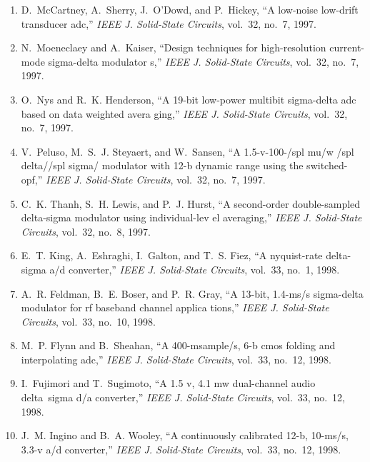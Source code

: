 \begin{enumerate}
\item
D.~McCartney, A.~Sherry, J.~O’Dowd, and P.~Hickey, ``A low-noise low-drift
  transducer adc,'' \emph{{IEEE} J. Solid-State Circuits}, vol.~32, no.~7,
  1997.

\item
N.~Moeneclaey and A.~Kaiser, ``Design techniques for high-resolution
  current-mode sigma-delta modulator s,'' \emph{{IEEE} J. Solid-State
  Circuits}, vol.~32, no.~7, 1997.

\item
O.~Nys and R.~K. Henderson, ``A 19-bit low-power multibit sigma-delta adc based
  on data weighted avera ging,'' \emph{{IEEE} J. Solid-State Circuits},
  vol.~32, no.~7, 1997.

\item
V.~Peluso, M.~S.~J. Steyaert, and W.~Sansen, ``A 1.5-v-100-/spl mu/w /spl
  delta//spl sigma/ modulator with 12-b dynamic range using the switched-opf,''
  \emph{{IEEE} J. Solid-State Circuits}, vol.~32, no.~7, 1997.

\item
C.~K. Thanh, S.~H. Lewis, and P.~J. Hurst, ``A second-order double-sampled
  delta-sigma modulator using individual-lev el averaging,'' \emph{{IEEE} J.
  Solid-State Circuits}, vol.~32, no.~8, 1997.

\item
E.~T. King, A.~Eshraghi, I.~Galton, and T.~S. Fiez, ``A nyquist-rate
  delta-sigma a/d converter,'' \emph{{IEEE} J. Solid-State Circuits}, vol.~33,
  no.~1, 1998.

\item
A.~R. Feldman, B.~E. Boser, and P.~R. Gray, ``A 13-bit, 1.4-ms/s sigma-delta
  modulator for rf baseband channel applica tions,'' \emph{{IEEE} J.
  Solid-State Circuits}, vol.~33, no.~10, 1998.

\item
M.~P. Flynn and B.~Sheahan, ``A 400-msample/s, 6-b cmos folding and
  interpolating adc,'' \emph{{IEEE} J. Solid-State Circuits}, vol.~33, no.~12,
  1998.

\item
I.~Fujimori and T.~Sugimoto, ``A 1.5 v, 4.1 mw dual-channel audio delta~sigma
  d/a converter,'' \emph{{IEEE} J. Solid-State Circuits}, vol.~33, no.~12,
  1998.

\item
J.~M. Ingino and B.~A. Wooley, ``A continuously calibrated 12-b, 10-ms/s, 3.3-v
  a/d converter,'' \emph{{IEEE} J. Solid-State Circuits}, vol.~33, no.~12,
  1998.


\end{enumerate}
